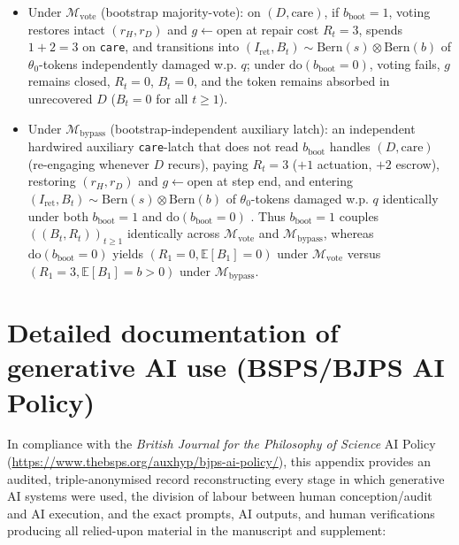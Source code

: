 \documentclass[12pt,letterpaper]{article}
\providecommand{\tightlist}{\setlength{\itemsep}{2pt}\setlength{\parskip}{0pt}}
\begin{document}
\begin{itemize}
\tightlist
\item
  Under \(\mathcal{M}_{\mathrm{vote}}\) (bootstrap majority-vote): on
  \((D, \mathrm{care})\), if \(b_{\mathrm{boot}} = 1\), voting restores
  intact \((r_H, r_D)\) and \(g \leftarrow \mathrm{open}\) at repair
  cost \(R_t = 3\), spends \(1 + 2 = 3\) on \texttt{care}, and
  transitions into
  \((I_{\mathrm{ret}}, B_t) \sim \mathrm{Bern}(s) \otimes \mathrm{Bern}(b)\)
  of \(\theta_0\)-tokens independently damaged w.p. \(q\); under
  \(\mathrm{do}(b_{\mathrm{boot}} = 0)\), voting fails, \(g\) remains
  \(\mathrm{closed}\), \(R_t = 0\), \(B_t = 0\), and the token remains
  absorbed in unrecovered \(D\) (\(B_t = 0\) for all \(t \ge 1\)).
\item
  Under \(\mathcal{M}_{\mathrm{bypass}}\) (bootstrap-independent
  auxiliary latch): an independent hardwired auxiliary
  \texttt{care}-latch that does not read \(b_{\mathrm{boot}}\) handles
  \((D, \mathrm{care})\) (re-engaging whenever \(D\) recurs), paying
  \(R_t = 3\) (\(+1\) actuation, \(+2\) escrow), restoring
  \((r_H, r_D)\) and \(g \leftarrow \mathrm{open}\) at step end, and
  entering
  \((I_{\mathrm{ret}}, B_t) \sim \mathrm{Bern}(s) \otimes \mathrm{Bern}(b)\)
  of \(\theta_0\)-tokens damaged w.p. \(q\) identically under both
  \(b_{\mathrm{boot}} = 1\) and \(\mathrm{do}(b_{\mathrm{boot}} = 0)\)
  \citep{rubenstein2017}. Thus \(b_{\mathrm{boot}} = 1\) couples
  \(((B_t, R_t))_{t\ge 1}\) identically across
  \(\mathcal{M}_{\mathrm{vote}}\) and \(\mathcal{M}_{\mathrm{bypass}}\),
  whereas \(\mathrm{do}(b_{\mathrm{boot}} = 0)\) yields
  \((R_1 = 0, \mathbb{E}[B_1] = 0)\) under
  \(\mathcal{M}_{\mathrm{vote}}\) versus
  \((R_1 = 3, \mathbb{E}[B_1] = b > 0)\) under
  \(\mathcal{M}_{\mathrm{bypass}}\).
\end{itemize}

\section{Detailed documentation of generative AI use (BSPS/BJPS AI
Policy)}\label{detailed-documentation-of-generative-ai-use-bspsbjps-ai-policy}

In compliance with the \emph{British Journal for the Philosophy of
Science} AI Policy
(\url{https://www.thebsps.org/auxhyp/bjps-ai-policy/}), this appendix
provides an audited, triple-anonymised record reconstructing every stage
in which generative AI systems were used, the division of labour between
human conception/audit and AI execution, and the exact prompts, AI
outputs, and human verifications producing all relied-upon material in
the manuscript and supplement:
\end{document}
